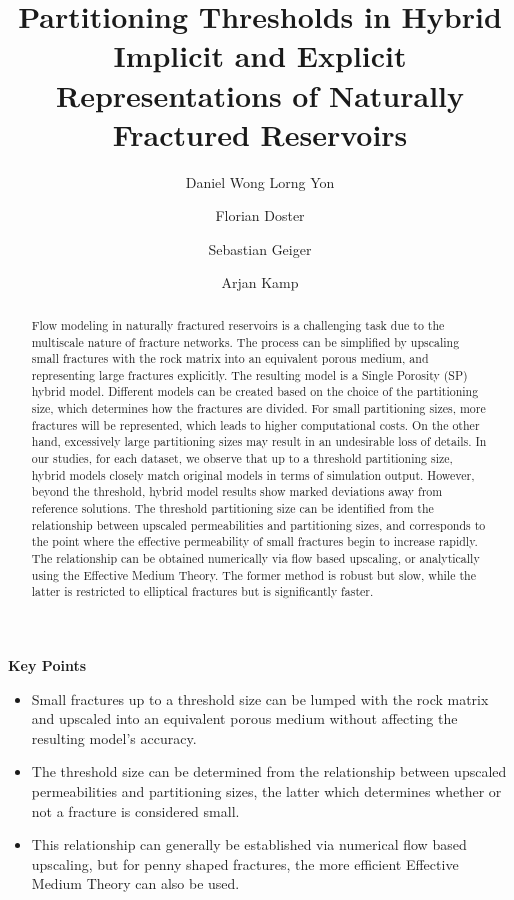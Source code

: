 \documentclass[a4paper]{article}
\title{Partitioning Thresholds in Hybrid Implicit and Explicit Representations of Naturally Fractured Reservoirs}
\author{Daniel Wong Lorng Yon \and Florian Doster \and Sebastian Geiger \and Arjan Kamp}
\begin{document}
\maketitle

\textbf{Key Points}
\begin{itemize}
	\item Small fractures up to a threshold size can be lumped with the rock matrix and upscaled into an equivalent porous medium without affecting the resulting model's accuracy.
	\item The threshold size can be determined from the relationship between upscaled permeabilities and partitioning sizes, the latter which determines whether or not a fracture is considered small.
	\item This relationship can generally be established via numerical flow based upscaling, but for penny shaped fractures, the more efficient Effective Medium Theory can also be used.
\end{itemize}

\begin{abstract}
Flow modeling in naturally fractured reservoirs is a challenging task due to the multiscale nature of fracture networks. The process can be simplified by upscaling small fractures with the rock matrix into an equivalent porous medium, and representing large fractures explicitly. The resulting model is a Single Porosity (SP) hybrid model. Different models can be created based on the choice of the partitioning size, which determines how the fractures are divided. For small partitioning sizes, more fractures will be represented, which leads to higher computational costs. On the other hand, excessively large partitioning sizes may result in an undesirable loss of details. In our studies, for each dataset, we observe that up to a threshold partitioning size, hybrid models closely match original models in terms of simulation output. However, beyond the threshold, hybrid model results show marked deviations away from reference solutions. The threshold partitioning size can be identified from the relationship between upscaled permeabilities and partitioning sizes, and corresponds to the point where the effective permeability of small fractures begin to increase rapidly. The relationship can be obtained numerically via flow based upscaling, or analytically using the Effective Medium Theory. The former method is robust but slow, while the latter is restricted to elliptical fractures but is significantly faster.
\end{abstract}
\end{document}
